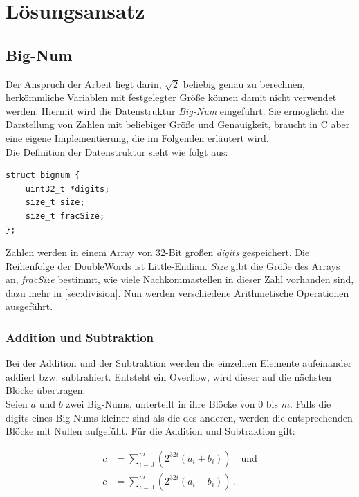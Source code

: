 \documentclass[course=erap]{aspdoc}
\begin{document}
\section{Lösungsansatz} \label{sec:loesungsansatz}
\subsection{Big-Num} \label{sec:bignum}
Der Anspruch der Arbeit liegt darin, $\sqrt{2}$ beliebig genau zu berechnen, herkömmliche Variablen mit festgelegter Größe können damit nicht verwendet werden. Hiermit wird die Datenstruktur \textit{Big-Num} eingeführt.
Sie ermöglicht die Darstellung von Zahlen mit beliebiger Größe und Genauigkeit, braucht in C aber eine eigene Implementierung, die im Folgenden erläutert wird. \\
Die Definition der Datenstruktur sieht wie folgt aus:

\begin{lstlisting}
struct bignum {
    uint32_t *digits;
    size_t size;
    size_t fracSize;
};
\end{lstlisting}

Zahlen werden in einem Array von 32-Bit großen \textit{digits} gespeichert. Die Reihenfolge der DoubleWords ist Little-Endian. \textit{Size} gibt die Größe des Arrays an, \textit{fracSize} bestimmt, 
wie viele Nachkommastellen in dieser Zahl vorhanden sind, dazu mehr in \ref{sec:division}. Nun werden verschiedene Arithmetische Operationen ausgeführt.

\subsubsection*{Addition und Subtraktion}
Bei der Addition und der Subtraktion werden die einzelnen Elemente aufeinander addiert bzw. subtrahiert. Entsteht ein Overflow, wird dieser auf die nächsten Blöcke übertragen. \\
Seien $a$ und $b$ zwei Big-Nums, unterteilt in ihre Blöcke von $0$ bis $m$. Falls die digits eines Big-Nums kleiner sind als die des anderen, werden die entsprechenden Blöcke mit Nullen aufgefüllt. 
Für die Addition und Subtraktion gilt:

\begin{align}
  c &= \sum_{i=0}^m \left(2^{32i} (a_i + b_i)\right) \quad  \text{und} \label{eq:bignum_addition} \\
  c &= \sum_{i=0}^m \left(2^{32i} (a_i - b_i)\right) \, .          \label{eq:bignum_subtraktion}
\end{align}
\end{document}
